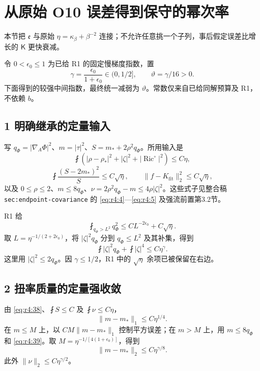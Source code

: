 \documentclass[UTF8,11pt,openany,oneside,fontset=none]{ctexbook}
\begin{document}
\section{从原始 O10 误差得到保守的幂次率}\label{ch4:ux4eceux539fux59cb-o10-ux8befux5deeux5f97ux5230ux4fddux5b88ux7684ux5e42ux6b21ux7387}

本节把 \(\mathfrak e\) 与原始 \(\eta=\kappa_\beta+\beta^{-2}\) 连接；不允许任意挑一个子列，事后假定误差比增长的 \(\mathsf K\) 更快衰减。

令 \(0<\epsilon_0\le1\) 为已给 R1 的固定慢梯度指数，置 \[
\gamma=\frac{\epsilon_0}{1+\epsilon_0}\in(0,1/2],
\qquad \vartheta=\gamma/16>0.
\] 下面得到的较强中间指数，最终统一减弱为 \(\vartheta\)。常数仅来自已给同解预算及 R1，不依赖 \(b\)。

\subsection{1 明确继承的定量输入}\label{ch4:ux660eux786eux7ee7ux627fux7684ux5b9aux91cfux8f93ux5165}

写 \(q_\Phi=|\nabla_A\Phi|^2\)、\(m=|\tau|^2\)、\(S=m_*+2\rho^2q_\Phi\)。所用输入是 \[
\fint\left(|\rho-\rho_*|^2+|\zeta|^2+|\operatorname{Ric}^{\circ}|^2\right)\le C\eta,
\] \[
\fint\frac{(S-2m_*)^2}{S}\le C\sqrt\eta,
\qquad
\|f-K_{\mathrm{fit}}\|_2^2\le C\sqrt\eta,
\tag{4.38}\label{eq:r4:38}
\] 以及 \(0\le\rho\le2\)、\(m\le8q_\Phi\)、\(\nu=2\rho^2q_\Phi-m\le4\rho|\zeta|^2\)。这些式子见整合稿 \texttt{sec:endpoint-covariance} 的 \eqref{eq:r4:4}---\eqref{eq:r4:5} 及强流前置第3.2节。

R1 给 \[
\fint_{q_\Phi>L^2}q_\Phi^2
\le C L^{-2\epsilon_0}+C\sqrt\eta.
\tag{4.39}\label{eq:r4:39}
\] 取 \(L=\eta^{-1/(2+2\epsilon_0)}\)，将 \(|\zeta|^2q_\Phi\) 分到 \(q_\Phi\le L^2\) 及其补集，得到 \[
\fint|\zeta|^2q_\Phi+\fint|\zeta|^4\le C\eta^\gamma.
\tag{4.40}\label{eq:r4:40}
\] 这里用 \(|\zeta|^2\le2q_\Phi\)。因 \(\gamma\le1/2\)，R1 中的 \(\sqrt\eta\) 余项已被保留在右边。

\subsection{2 扭率质量的定量强收敛}\label{ch4:ux626dux7387ux8d28ux91cfux7684ux5b9aux91cfux5f3aux6536ux655b}

由 \eqref{eq:r4:38}、\(\fint S\le C\) 及 \(\fint\nu\le C\eta\)， \[
\|m-m_*\|_1\le C\eta^{1/4}.
\] 在 \(m\le M\) 上，以 \(CM\|m-m_*\|_1\) 控制平方误差；在 \(m>M\) 上，用 \(m\le8q_\Phi\) 和 \eqref{eq:r4:39}。取 \(M=\eta^{-1/[4(1+\epsilon_0)]}\)，得到 \[
\boxed{\|m-m_*\|_2\le C\eta^{\gamma/8}.}
\tag{4.41}\label{eq:r4:41}
\] 此外 \(\|\nu\|_2\le C\eta^{\gamma/2}\)。
\end{document}
